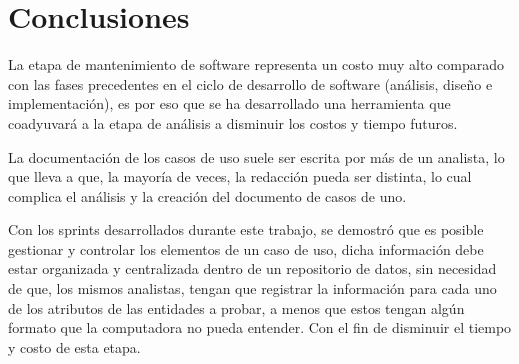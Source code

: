 \chapter{Conclusiones} \label{cap:diez}

La etapa de mantenimiento de software representa un costo muy alto comparado con las fases precedentes en el ciclo de desarrollo de software (análisis, diseño e implementación), es por eso que se ha desarrollado una herramienta que coadyuvará a la etapa de análisis a disminuir los costos y tiempo futuros.

La documentación de los casos de uso suele ser escrita por más de un analista, lo que lleva a que,
la mayoría de veces, la redacción pueda ser distinta, lo cual complica el análisis y la creación del documento de casos de uno.

Con los sprints desarrollados durante este trabajo, se demostró que es posible gestionar y controlar los elementos de un caso de uso, dicha información debe estar organizada y centralizada dentro de un repositorio de datos, sin necesidad de que, los mismos analistas, tengan que registrar la información para cada uno de los atributos de las entidades a probar, a menos que estos tengan algún formato que la computadora no pueda entender. Con el fin de disminuir el tiempo y costo de esta etapa.

